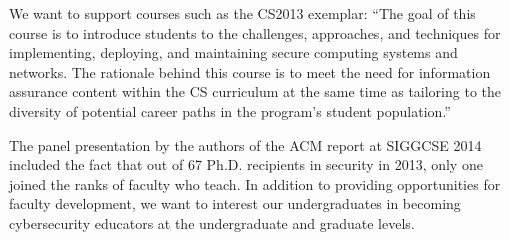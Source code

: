 \noindent 
We want to support courses such as the CS2013 exemplar: ``The goal of this course is to introduce 
students to the challenges, approaches, and techniques 
for implementing, deploying, and maintaining secure computing systems and networks. The rationale behind this 
course is to meet the
need for information assurance content within the CS curriculum at the same time as tailoring to the diversity of
potential career paths in the program's student population.''~\cite{IEEE_CS_2013}

The panel presentation by the authors of the ACM report at SIGGCSE 2014 included the
fact that out of 67 Ph.D. recipients in security in 2013, only one joined the ranks of 
faculty who teach.
In addition to providing opportunities for faculty development, we want to 
interest our undergraduates in becoming cybersecurity educators at the undergraduate and
graduate levels.


